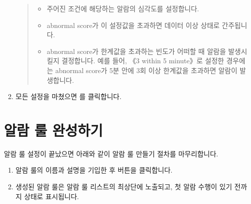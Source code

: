 \documentclass[letterpaper,10pt,english]{sphinxmanual}
\begin{document}
\begin{enumerate}
\begin{quote}
\begin{figure}[H]
\noindent{}
\end{figure}
\begin{itemize}
\item {} 
 주어진 조건에 해당하는 알람의 심각도를 설정합니다.

\item {} 
 abnormal score가 이 설정값을 초과하면 데이터 이상 상태로 간주됩니다.

\item {} 
 abnormal score가 한계값을 초과하는 빈도가 어떠할 때 알람을 발생시킬지 결정합니다. 예를 들어, 《3 within 5 minute》로 설정한 경우에는 abnormal score가 5분 안에 3회 이상 한계값을 초과하면 알람이 발생합니다.

\end{itemize}
\end{quote}

\item {} 
모든 설정을 마쳤으면 를 클릭합니다.

\end{enumerate}


\section{알람 룰 완성하기}
\label{\detokenize{part02/index:complete-rule}}\label{\detokenize{part02/index:id7}}
알람 룰 설정이 끝났으면 아래와 같이 알람 룰 만들기 절차를 마무리합니다.
\begin{enumerate}
%
\item {} 
알람 룰의 이름과 설명을 기입한 후  버튼을 클릭합니다.
\begin{quote}

\begin{figure}[H]
\centering

\noindent{}
\end{figure}
\end{quote}

\item {} 
생성된 알람 룰은 알람 룰 리스트의 최상단에 노출되고, 첫 알람 수행이 있기 전까지  상태로 표시됩니다.
\begin{quote}

\begin{figure}[H]
\centering

\noindent{}
\end{figure}
\end{quote}

\end{enumerate}
\end{document}
